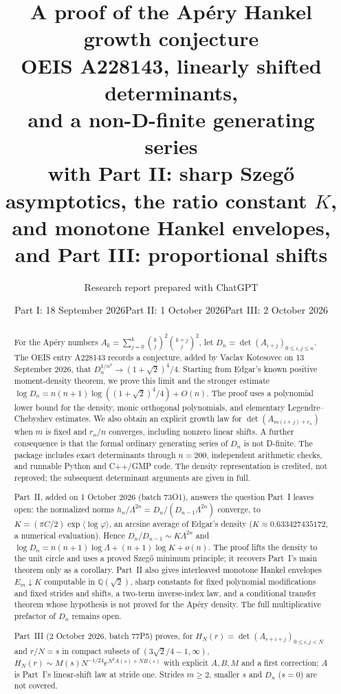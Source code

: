 \documentclass[11pt,a4paper]{article}
\title{\vspace{-1.3em}\color{ink}\textbf{A proof of the Ap\'ery Hankel\texorpdfstring{\\}{ }growth conjecture}\vspace{0.25em}\\
\large OEIS A228143, linearly shifted determinants,\texorpdfstring{\\}{ }and a non-D-finite generating series\texorpdfstring{\\[0.4em]}{; }\normalsize with Part II: sharp Szeg\H{o} asymptotics, the ratio constant $K$,\texorpdfstring{\\}{ }and monotone Hankel envelopes, and Part III: proportional shifts}
\author{Research report prepared with ChatGPT}
\date{Part I: 18 September 2026\quad Part II: 1 October 2026\quad Part III: 2 October 2026}
\numberwithin{equation}{section}
\theoremstyle{remark}\newtheorem{remark}[theorem]{Remark}
\begin{document}
\maketitle
\thispagestyle{empty}
\begin{abstract}
For the Ap\'ery numbers $A_k=\sum_{j=0}^k\binom{k}{j}^2\binom{k+j}{j}^2$, let
$D_n=\det(A_{i+j})_{0\leq i,j\leq n}$. The OEIS entry A228143 records a conjecture,
added by Vaclav Kotesovec on 13 September 2026, that
$D_n^{1/n^2}\to(1+\sqrt2)^4/4$. Starting from Edgar's known positive moment-density
theorem, we prove this limit and the stronger estimate
$\log D_n=n(n+1)\log((1+\sqrt2)^4/4)+O(n)$.
The proof uses a polynomial lower bound for the density, monic orthogonal
polynomials, and elementary Legendre--Chebyshev estimates. We also obtain an
explicit growth law for $\det(A_{m(i+j)+r_n})$ when $m$ is fixed and $r_n/n$
converges, including nonzero linear shifts. A further consequence is that the
formal ordinary generating series of $D_n$ is not D-finite. The package includes
exact determinants through $n=200$, independent arithmetic checks, and runnable
Python and C++/GMP code. The density representation is credited, not reproved;
the subsequent determinant arguments are given in full.

Part~II, added on 1 October 2026 (batch 73O1), answers the question Part~I
leaves open: the normalized norms $h_n/\Lambda^{2n}=D_n/(D_{n-1}\Lambda^{2n})$
converge, to $K=(\pi C/2)\exp\langle\log\varphi\rangle$, an arcsine average
of Edgar's density ($K\approx0.633427435172$, a numerical evaluation). Hence
$D_n/D_{n-1}\sim K\Lambda^{2n}$ and
$\log D_n=n(n+1)\log\Lambda+(n+1)\log K+o(n)$. The proof lifts the density to
the unit circle and uses a proved Szeg\H{o} minimum principle; it recovers
Part~I's main theorem only as a corollary. Part~II also gives interleaved
monotone Hankel envelopes $E_m\downarrow K$ computable in
$\mathbb Q(\sqrt2)$, sharp constants for fixed polynomial modifications and
fixed strides and shifts, a two-term inverse-index law, and a conditional
transfer theorem whose hypothesis is not proved for the Ap\'ery density. The
full multiplicative prefactor of $D_n$ remains open.

Part~III (2 October 2026, batch 77P5) proves, for
$H_N(r)=\det(A_{r+i+j})_{0\leq i,j<N}$ and $r/N=s$ in compact subsets of
$(3\sqrt2/4-1,\infty)$, $H_N(r)\sim M(s)N^{-1/24}e^{N^2A(s)+NB(s)}$ with
explicit $A,B,M$ and a first correction; $A$ is Part~I's linear-shift law at
stride one. Strides $m\geq2$, smaller $s$ and $D_n$ ($s=0$) are not covered.
\end{abstract}
\end{document}
